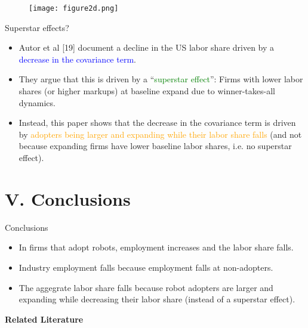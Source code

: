\documentclass[notes=show]{beamer}
\begin{document}
\newpage
\begin{center}
\vspace*{0.2cm}
\begin{figure}
\texttt{[image: figure2d.png]}
\end{figure} 
\end{center}
\newpage

\begin{frame}{Superstar effects?}
\begin{itemize}
\item Autor et al [19] document a decline in the US labor share driven by a \textcolor{blue}{decrease in the covariance term}. \medskip
\item They argue that this is driven by a ``\textcolor{green}{superstar effect}'': Firms with lower labor shares (or higher markups) at baseline expand due to winner-takes-all dynamics. \medskip
\item Instead, this paper shows that the decrease in the covariance term is driven by \textcolor{orange}{adopters being larger and expanding while their labor share falls} (and not because expanding firms have lower baseline labor shares, i.e. no superstar effect).
\end{itemize}
\end{frame}

\section{V. Conclusions}

\begin{frame}{Conclusions}
\begin{itemize}
\item In firms that adopt robots, employment increases and the labor share falls. \medskip
\item Industry employment falls because employment falls at non-adopters. \medskip
\item The aggegrate labor share falls because robot adopters are larger and expanding while decreasing their labor share (instead of a superstar effect).
\end{itemize}
\end{frame}

\appendix

\begin{frame}
\begin{center}
{\Large \textbf{Related Literature}}
\end{center}
\end{frame}
\end{document}
